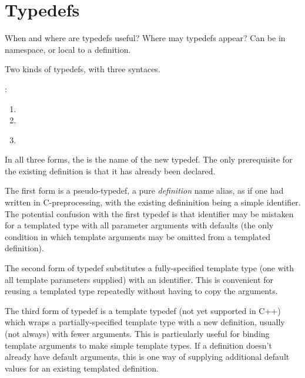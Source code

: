 

\chapter{Typedefs}
\label{sec:typedefs}

When and where are typedefs useful?  
Where may typedefs appear?
Can be in namespace, or local to a definition.  

Two kinds of typedefs, with three syntaces.  

\medskip
\noindent
{}:
\begin{enumerate}
\item {}  \ttt{;}
\item {}  
	\ttt{<}  \ttt{>} \ttt{;}
\item {}\\
	  
	\ttt{<}  \ttt{>} \ttt{;}
\end{enumerate}

In all three forms, 
the  is the name of the new typedef.  
The only prerequisite for the existing definition is that it has already 
been declared.  

The first form is a pseudo-typedef, a pure \emph{definition} name alias, 
as if one had written 
   in C-preprocessing, 
with the existing defininition being a simple identifier.  
The potential confusion with the first typedef is that 
 identifier may be mistaken for a templated type
with all parameter arguments with defaults 
(the only condition in which template arguments 
may be omitted from a templated definition).  

The second form of typedef substitutes a fully-specified template type
(one with all template parameters supplied) with an identifier.  
This is convenient for reusing a templated type repeatedly without
having to copy the arguments.  

The third form of typedef is a template typedef (not yet supported in C++)
which wraps a partially-specified template type with a new definition, 
usually (not always) with fewer arguments.  
This is particularly useful for binding template arguments
to make simple template types.  
If a definition doesn't already have default arguments, 
this is one way of supplying additional default values 
for an existing templated definition.  

